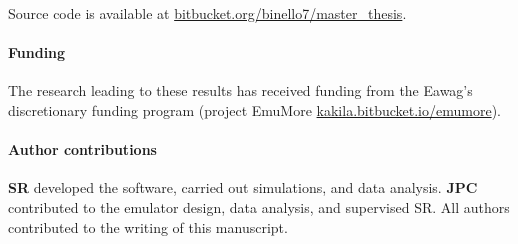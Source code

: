 \documentclass[12pt,a4paper,english,twocolumn,fleqn]{narms}
\begin{document}
Source code is available at \url{bitbucket.org/binello7/master_thesis}.

\paragraph*{Funding} The research leading to these results has received funding from the Eawag's discretionary funding program (project EmuMore \url{kakila.bitbucket.io/emumore}).

\paragraph*{Author contributions}
\textbf{SR} developed the software, carried out simulations, and data analysis.
\textbf{JPC} contributed to the emulator design, data analysis, and supervised SR. All authors contributed to the writing of this manuscript.

\sloppy


\end{document}
